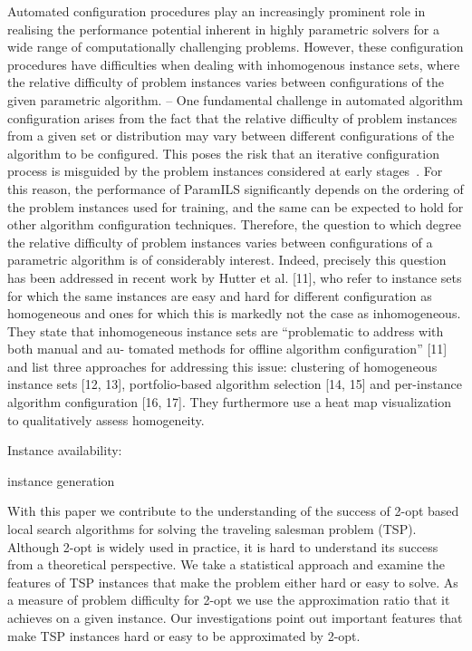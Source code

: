 \documentclass{article}
\begin{document}
{Automated configuration procedures play an increasingly prominent role in realising the performance potential inherent in highly parametric solvers for a wide range of computationally challenging problems. However, these configuration procedures have difficulties when dealing with inhomogenous instance sets, where the relative difficulty of problem instances varies between configurations of the given parametric algorithm. 
--
One fundamental challenge in automated algorithm configuration arises from the fact that the relative difficulty of problem instances from a given set or distribution may vary between different configurations of the algorithm to be configured. This poses the risk that an iterative configuration process is misguided by the problem instances considered at early stages~\cite{Schneider2012homogeneity}. For this reason, the performance of ParamILS significantly depends on the ordering of the problem instances used for training, and the same can be expected to hold for other algorithm configuration techniques. 
Therefore, the question to which degree the relative difficulty of problem instances varies between configurations of a parametric algorithm is of considerably interest. Indeed, precisely this question has been addressed in recent work by Hutter et al. [11], who refer to instance sets for which the same instances are easy and hard for different configuration as homogeneous and ones for which this is markedly not the case as inhomogeneous. They state that inhomogeneous instance sets are “problematic to address with both manual and au- tomated methods for offline algorithm configuration” [11] and list three approaches for addressing this issue: clustering of homogeneous instance sets [12, 13], portfolio-based algorithm selection [14, 15] and per-instance algorithm configuration [16, 17]. They furthermore use a heat map visualization to qualitatively assess homogeneity.


Instance availability:

instance generation

\cite{Mersmann2012twoopt,Nallaperuma2013christofides}
With this paper we contribute to the understanding of the success of 2-opt based local search algorithms for solving the traveling salesman problem (TSP). Although 2-opt is widely used in practice, it is hard to understand its success from a theoretical perspective. We take a statistical approach and examine the features of TSP instances that make the problem either hard or easy to solve. As a measure of problem difficulty for 2-opt we use the approximation ratio that it achieves on a given instance. Our investigations point out important features that make TSP instances hard or easy to be approximated by 2-opt.

}
\end{document}
